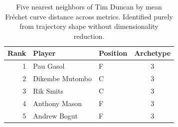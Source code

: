 \begin{table}[htbp]
  \centering\small
  \begin{tabular}{rllc}
    \toprule
    Rank & Player & Position & Archetype \\
    \midrule
    1 & Pau Gasol & F & 3 \\
    2 & Dikembe Mutombo & C & 3 \\
    3 & Rik Smits & C & 3 \\
    4 & Anthony Mason & F & 3 \\
    5 & Andrew Bogut & F & 3 \\
    \bottomrule
  \end{tabular}
  \caption{Five nearest neighbors of Tim Duncan by mean Fr\'{e}chet curve distance across metrics. Identified purely from trajectory shape without dimensionality reduction.}
  \label{tab:Tim_Duncan_frechet_curve_neighbors}
\end{table}

